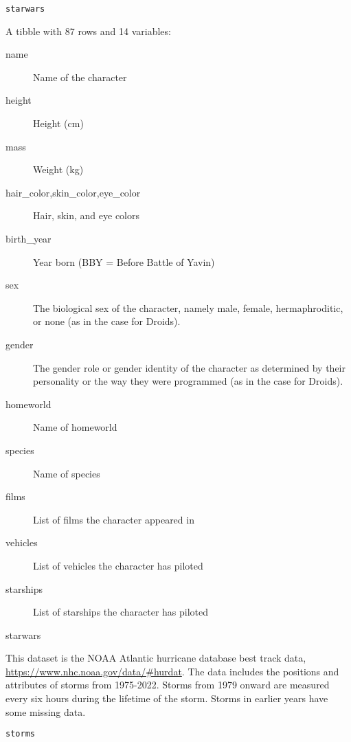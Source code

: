 \documentclass[a4paper]{book}
\begin{document}
%
\begin{Usage}
\begin{verbatim}
starwars
\end{verbatim}
\end{Usage}
%
\begin{Format}
A tibble with 87 rows and 14 variables:
\begin{description}

\item[name] Name of the character
\item[height] Height (cm)
\item[mass] Weight (kg)
\item[hair\_color,skin\_color,eye\_color] Hair, skin, and eye colors
\item[birth\_year] Year born (BBY = Before Battle of Yavin)
\item[sex] The biological sex of the character, namely male, female, hermaphroditic, or none (as in the case for Droids).
\item[gender] The gender role or gender identity of the character as determined by their personality or the way they were programmed (as in the case for Droids).
\item[homeworld] Name of homeworld
\item[species] Name of species
\item[films] List of films the character appeared in
\item[vehicles] List of vehicles the character has piloted
\item[starships] List of starships the character has piloted

\end{description}

\end{Format}
%
\begin{Examples}
\begin{ExampleCode}
starwars
\end{ExampleCode}
\end{Examples}
%
\begin{Description}
This dataset is the NOAA Atlantic hurricane database best track data,
\url{https://www.nhc.noaa.gov/data/\#hurdat}. The data includes the positions and
attributes of storms from 1975-2022. Storms
from 1979 onward are measured every six hours during the lifetime of the
storm. Storms in earlier years have some missing data.
\end{Description}
%
\begin{Usage}
\begin{verbatim}
storms
\end{verbatim}
\end{Usage}
\end{document}
